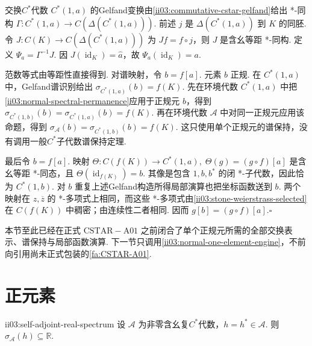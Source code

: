 \begin{FAProof}
交换\(\displaystyle C^*\)代数 \(\displaystyle C^*(1,a)\) 的Gelfand变换由\autoref{ii03:commutative-cstar-gelfand}给出 *-同构
\(\displaystyle \Gamma:C^*(1,a)\longrightarrow C(\Delta(C^*(1,a))).\)
前述 \(\displaystyle j\) 是 \(\displaystyle\Delta(C^*(1,a))\) 到 \(\displaystyle K\) 的同胚. 令 \(\displaystyle J:C(K)\to C(\Delta(C^*(1,a)))\) 为 \(\displaystyle Jf=f\circ j\)，则 \(\displaystyle J\) 是含幺等距 *-同构. 定义 \(\displaystyle\Psi_a=\Gamma^{-1}J\). 因 \(\displaystyle J(\operatorname{id}_K)=\widehat a\)，故 \(\displaystyle\Psi_a(\operatorname{id}_K)=a\).

范数等式由等距性直接得到. 对谱映射，令 \(\displaystyle b=f[a]\). 元素 \(\displaystyle b\) 正规. 在 \(\displaystyle C^*(1,a)\) 中，Gelfand谱识别给出 \(\displaystyle\sigma_{C^*(1,a)}(b)=f(K)\). 先在环境代数 \(\displaystyle C^*(1,a)\) 中把\autoref{ii03:normal-spectral-permanence}应用于正规元 \(\displaystyle b\)，得到
\(\displaystyle \sigma_{C^*(1,b)}(b)=\sigma_{C^*(1,a)}(b)=f(K).\)
再在环境代数 \(\displaystyle\mathcal A\) 中对同一正规元应用该命题，得到
\(\displaystyle \sigma_{\mathcal A}(b)=\sigma_{C^*(1,b)}(b)=f(K).\)
这只使用单个正规元的谱保持，没有调用一般\(\displaystyle C^*\)子代数谱保持定理.

最后令 \(\displaystyle b=f[a]\). 映射
\(\displaystyle \Theta:C(f(K))\longrightarrow C^*(1,a), \; \Theta(g)=(g\circ f)[a]\)
是含幺等距 *-同态，且 \(\displaystyle\Theta(\operatorname{id}_{f(K)})=b\). 其像是包含 \(\displaystyle1,b,b^*\) 的闭 *-子代数，因此恰为 \(\displaystyle C^*(1,b)\). 对 \(\displaystyle b\) 重复上述Gelfand构造所得局部演算也把坐标函数送到 \(\displaystyle b\). 两个映射在 \(\displaystyle z,\overline z\) 的 *-多项式上相同，而这些 *-多项式由\autoref{ii03:stone-weierstrass-selected}在 \(\displaystyle C(f(K))\) 中稠密；由连续性二者相同. 因而 \(\displaystyle g[b]=(g\circ f)[a]\).\hfill\(\square\)
\end{FAProof}

本节至此已经在正式 \(\displaystyle\mathrm{CSTAR\!-\!A01}\) 之前闭合了单个正规元所需的全部交换表示、谱保持与局部函数演算. 下一节只调用\autoref{ii03:normal-one-element-engine}，不前向引用尚未正式包装的\autoref{fa:CSTAR-A01}.

\section{正元素}\label{sec:ii03-positive-elements}

\begin{FAProposition}[B][自伴元的谱为实数]{ii03:self-adjoint-real-spectrum}
设 \(\displaystyle\mathcal A\) 为非零含幺复\(\displaystyle C^*\)代数，\(\displaystyle h=h^*\in\mathcal A\). 则
\(\displaystyle \sigma_{\mathcal A}(h)\subseteq\mathbb R.\)
\end{FAProposition}

